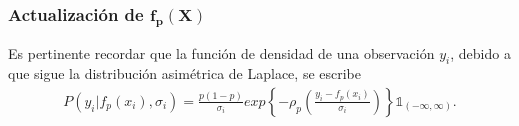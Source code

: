 \subsubsection{Actualizaci\'on de $\bm{f_p(X)}$}

Es pertinente recordar que la funci\'on de densidad de una observaci\'on $y_i$, debido a que sigue la distribuci\'on asim\'etrica de Laplace, se escribe
\begin{equation*}
\begin{aligned}
    P(y_i | f_p(x_i),\sigma_i) = 
    \frac{p(1-p)}{\sigma_i}
    exp \left\{-\rho_p
        \left(
            \frac{y_i-f_p(x_i)}{\sigma_i}
        \right)
    \right\}
    \mathds{1}_{(-\infty,\infty)}.
\end{aligned}
\end{equation*}


